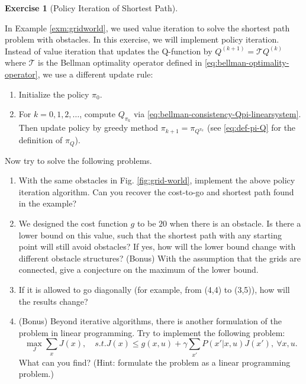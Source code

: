 \documentclass[
]{book}
\theoremstyle{definition}
\theoremstyle{definition}
\theoremstyle{definition}
\newtheorem{exercise}{Exercise}[chapter]
\theoremstyle{definition}
\theoremstyle{remark}
\begin{document}
\begin{exercise}[Policy Iteration of Shortest Path]
\protect\hypertarget{exr:shortest-path}{}\label{exr:shortest-path}

In Example \ref{exm:gridworld}, we used value iteration to solve the shortest path problem with obstacles. In this exercise, we will implement policy iteration. Instead of value iteration that updates the Q-function by \(Q^{(k+1)} = \mathcal{T}Q^{(k)}\) where \(\mathcal{T}\) is the Bellman optimality operator defined in \eqref{eq:bellman-optimality-operator}, we use a different update rule:

\begin{enumerate}
\def\labelenumi{\arabic{enumi}.}
\item
  Initialize the policy \(\pi_0\).
\item
  For \(k=0,1,2,\ldots\), compute \(Q_{\pi_k}\) via \eqref{eq:bellman-consistency-Qpi-linearsystem}. Then update policy by greedy method \(\pi_{k+1}=\pi_{Q^{\pi_k}}\) (see \eqref{eq:def-pi-Q} for the definition of \(\pi_Q\)).
\end{enumerate}

Now try to solve the following problems.

\begin{enumerate}
\def\labelenumi{\alph{enumi}.}
\item
  With the same obstacles in Fig. \ref{fig:grid-world}, implement the above policy iteration algorithm. Can you recover the cost-to-go and shortest path found in the example?
\item
  We designed the cost function \(g\) to be \(20\) when there is an obstacle. Is there a lower bound on this value, such that the shortest path with any starting point will still avoid obstacles? If yes, how will the lower bound change with different obstacle structures? (Bonus) With the assumption that the grids are connected, give a conjecture on the maximum of the lower bound.
\item
  If it is allowed to go diagonally (for example, from (4,4) to (3,5)), how will the results change?
\item
  (Bonus) Beyond iterative algorithms, there is another formulation of the problem in linear programming. Try to implement the following problem:
  \[\max_{J} \sum_{x}J(x),\quad s.t. J(x)\le g(x,u) + \gamma\sum_{x'}P(x'|x,u)J(x'),\ \forall x,u.\]
  What can you find? (Hint: formulate the problem as a linear programming problem.)
\end{enumerate}

\end{exercise}
\end{document}
